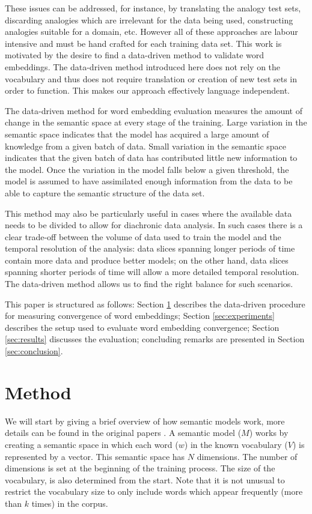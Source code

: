 \documentclass{article} %
\begin{document}
These issues can be addressed, for instance, by translating the analogy test sets, discarding analogies which are irrelevant for the data being used, constructing analogies suitable for a domain, etc. However all of these approaches are labour intensive and must be hand crafted for each training data set. This work is motivated by the desire to find a data-driven method to validate word embeddings. The data-driven method introduced here does not rely on the vocabulary and thus does not require translation or creation of new test sets in order to function. This makes our approach effectively language independent.

The data-driven method for word embedding evaluation measures the amount of change in the semantic space at every stage of the training. Large variation in the semantic space indicates that the model has acquired a large amount of knowledge from a given batch of data. Small variation in the semantic space indicates that the given batch of data has contributed little new information to the model. Once the variation in the model falls below a given threshold, the model is assumed to have assimilated enough information from the data to be able to capture the semantic structure of the data set.

This method may also be particularly useful in cases where the available data needs to be divided to allow for diachronic data analysis. In such cases there is a clear trade-off between the volume of data used to train the model and the temporal resolution of the analysis: data slices spanning longer periods of time contain more data and produce better models; on the other hand, data slices spanning shorter periods of time will allow a more detailed temporal resolution. The data-driven method allows us to find the right balance for such scenarios.

This paper is structured as follows: Section \ref{sec:method} describes the data-driven procedure for measuring convergence of word embeddings; Section \ref{sec:experiments} describes the setup used to evaluate word embedding convergence; Section \ref{sec:results} discusses the evaluation; concluding remarks are presented in Section \ref{sec:conclusion}.

\section{Method}
\label{sec:method}

We will start by giving a brief overview of how semantic models work, more details can be found in the original papers \cite{Mikolov_CS2013}. A semantic model ($M$) works by creating a semantic space in which each word ($w$) in the known vocabulary ($V$) is represented by a vector. This semantic space has $N$ dimensions. The number of dimensions is set at the beginning of the training process. The size of the vocabulary, is also determined from the start. Note that it is not unusual to restrict the vocabulary size to only include words which appear frequently (more than $k$ times) in the corpus.
\end{document}
